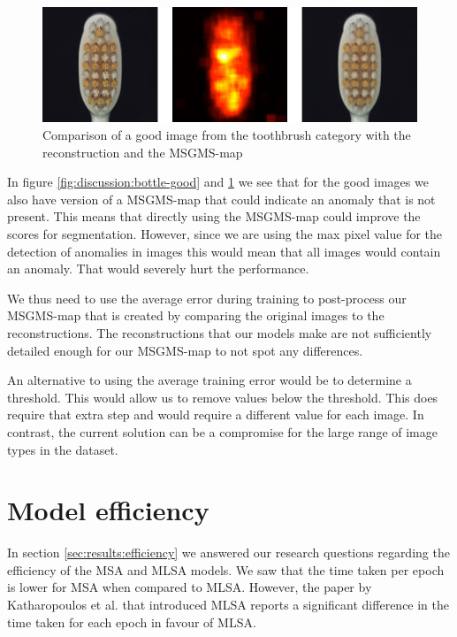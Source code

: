 \begin{figure}[ht!]
\centering
\includegraphics[width=\textwidth]{imgs/samples/toothbrush-good.jpg}
\caption{Comparison of a good image from the toothbrush category with the reconstruction and the MSGMS-map}
\label{fig:discussion:toothbrush-good}
\end{figure}

In figure \ref{fig:discussion:bottle-good} and \ref{fig:discussion:toothbrush-good} we see that for the good images we also have version of a MSGMS-map that could indicate an anomaly that is not present. This means that directly using the MSGMS-map could improve the scores for segmentation. However, since we are using the max pixel value for the detection of anomalies in images this would mean that all images would contain an anomaly. That would severely hurt the performance.

We thus need to use the average error during training to post-process our MSGMS-map that is created by comparing the original images to the reconstructions. The reconstructions that our models make are not sufficiently detailed enough for our MSGMS-map to not spot any differences.

An alternative to using the average training error would be to determine a threshold. This would allow us to remove values below the threshold. This does require that extra step and would require a different value for each image. In contrast, the current solution can be a compromise for the large range of image types in the dataset.

\section{Model efficiency}

In section \ref{sec:results:efficiency} we answered our research questions regarding the efficiency of the MSA and MLSA models. We saw that the time taken per epoch is lower for MSA when compared to MLSA. However, the paper by Katharopoulos et al. \cite{katharopoulos_transformers_2020} that introduced MLSA reports a significant difference in the time taken for each epoch in favour of MLSA.


